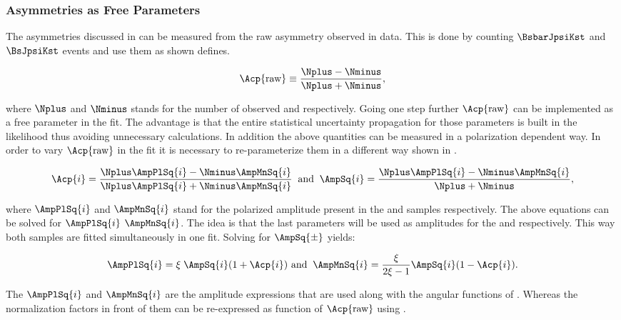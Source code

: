 \subsubsection{\CP Asymmetries as Free Parameters}
\label{cp_assymetries_and_total_decay_rate}
The \CP asymmetries discussed in  can be measured from the raw asymmetry observed in data.
This is done by counting $\BsbarJpsiKst$ and $\BsJpsiKst$ events and use them as shown  defines.

\begin{equation}
\Acp{\text{raw}} \equiv \frac{\Nplus - \Nminus}{\Nplus + \Nminus},
\label{acp_mes}
\end{equation}

\noindent where $\Nplus$ and $\Nminus$ stands for the number of observed \BsbarJpsiKst and \BsJpsiKst respectively.
Going one step further $\Acp{\text{raw}}$ can be implemented as a free parameter in the fit. The advantage
is that the entire statistical uncertainty propagation for those parameters is built in the likelihood thus avoiding
unnecessary calculations. In addition the above quantities can be measured in a polarization dependent way. In order
to vary $\Acp{\text{raw}}$ in the fit it is necessary to re-parameterize them in a different way shown in .

\begin{equation}
\Acp{i} = \frac{\Nplus\AmpPlSq{i} - \Nminus\AmpMnSq{i}}{\Nplus\AmpPlSq{i} + \Nminus\AmpMnSq{i} }\;\; \text{and} \;\;
\AmpSq{i} = \frac{ \Nplus \AmpPlSq{i} - \Nminus\AmpMnSq{i}}{\Nplus + \Nminus},
\label{acp_param}
\end{equation}

\noindent where $\AmpPlSq{i}$ and $\AmpMnSq{i}$ stand for the polarized amplitude present in the \BsbarJpsiKst
and \BsJpsiKst samples respectively. The above equations can be solved for $\AmpPlSq{i}$  $\AmpMnSq{i}$. The idea
is that the last parameters will be used as amplitudes for the \BsbarJpsiKst and \BsJpsiKst \pdfs respectively.
This way both samples are fitted simultaneously in one fit. Solving  for $\AmpSq{\pm}$ yields:

\begin{equation}
\AmpPlSq{i} = \xi \; \AmpSq{i} (1+\Acp{i}) \,\, \text{and}\;\; \AmpMnSq{i} = \frac{\xi}{2\xi-1} \AmpSq{i} (1-\Acp{i}).
\label{acp_free}
\end{equation}

\noindent The $\AmpPlSq{i}$ and $\AmpMnSq{i}$ are the amplitude expressions that are used along with the angular functions of .
Whereas the normalization factors in front of them can be re-expressed as function of $\Acp{\text{raw}}$ using .

